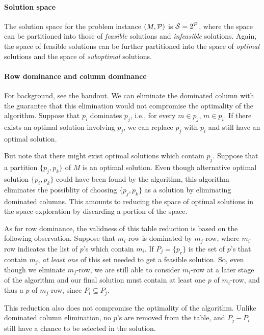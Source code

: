 \documentclass{note}
\begin{document}
\paragraph{Solution space}
The solution space for the problem instance $(M, {\cal P})$ is 
${\cal S} = 2^{\cal{}P}$,
where the space can be partitioned into those of
{\em feasible\/} solutions and {\em infeasible\/} solutions.
Again, the space of feasible solutions can be further partitioned
into the space of {\em optimal\/} solutions and the space of {\em suboptimal\/}
solutions.


\paragraph{Row dominance and column dominance}
For background, see the handout.
We can eliminate the dominated column with the guarantee that
this elimination would not compromise the optimality of the algorithm.
Suppose that $p_i$ dominates $p_j$, i.e., for every $m \in p_j$, 
$m \in p_i$.
If there exists an optimal solution involving $p_j$,
we can replace $p_j$ with $p_i$ and still have an optimal solution.

But note that there might exist optimal solutions
which contain $p_j$.
Suppose that a partition $\{p_j, p_k\}$  of $M$
is an optimal solution.
Even though alternative optimal solution $\{p_i, p_k\}$ could have been 
found by the algorithm, this algorithm eliminates the possiblity
of choosing $\{p_j, p_k\}$ as a solution by eliminating dominated columns.
This amounts to reducing 
the space of optimal solutions in the space exploration by discarding
a portion of the space.


As for row dominance, the validness of this table reduction is based
on the following observation.
Suppose that $m_i$-row is dominated by $m_j$-row, where
$m_i$-row indicates the list of $p$'s which contain $m_i$.
If $P_j = \{p_r\}$ is the set of $p$'s that
contain $m_j$, {\em at least one\/} of this set needed
to get a feasible solution.
So, even though we elminate $m_j$-row, we are still able to 
consider $m_i$-row at a later stage of the algorithm and
our final solution must contain at least one $p$ of $m_i$-row, and thus
a $p$ of $m_j$-row, since $P_i \subseteq P_j$.

This reduction also does not compromise the optimality of the 
algorithm. 
Unlike dominated column elimination, no $p$'s are removed from
the table, and $P_j - P_i$ still have a chance to be selected 
in the solution.
\end{document}
